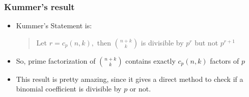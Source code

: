 \documentclass{beamer}
\begin{document}
\begin{frame}
    \frametitle{Kummer's result}
    \begin{itemize}
        \item Kummer's Statement is:
        \begin{quote}
            Let $r = c_p(n,k),$ then $\binom{n+k}{k}$ is divisible by $p^r$ but not $p^{r + 1}$
        \end{quote}
        \item So, prime factorization of $\binom{n+k}{k}$ contains exactly $c_p(n,k)$ factors of $p$
        \item This result is pretty amazing, since it gives a direct method to check if a binomial coefficient is divisible by $p$ or not.
        
    \end{itemize}
\end{frame}
\end{document}
